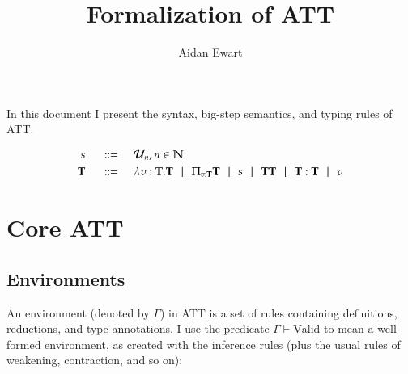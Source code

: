 \documentclass{article}
\author{Aidan Ewart}
\title{Formalization of ATT}
\newcommand{\set}{\mathcal{U}}
\newcommand{\nat}{\mathbb{N}}
\newcommand{\fun}[2]{\lambda #1. #2}
\newcommand{\for}[2]{\Pi_{#1}#2}
\newcommand{\bnfdef}{\hspace{0.5cm} ::= \hspace{0.5cm}}
\newcommand{\alt}{\hspace{0.25cm} | \hspace{0.25cm}}
\newcommand{\bb}{\mathbf}
\begin{document}
\maketitle
In this document I present the syntax, big-step semantics, and typing rules of ATT.

\begin{align*}
    s \bnfdef& \set_n, n \in \nat
    \\
    \bb{T} \bnfdef& \fun{v:\bb{T}}{\bb{T}} \alt \for{v : \bb{T}}{\bb{T}} \alt s \alt \bb{T T} \alt \bb{T} : \bb{T} \alt v
\end{align*}

\section{Core ATT}

\subsection{Environments}

An environment (denoted by $\Gamma$) in ATT is a set of rules containing definitions, reductions, and type annotations. I use the predicate $\Gamma \vdash \mathrm{Valid}$ to mean a well-formed environment, as created with the inference rules (plus the usual rules of weakening, contraction, and so on):

\end{document}
